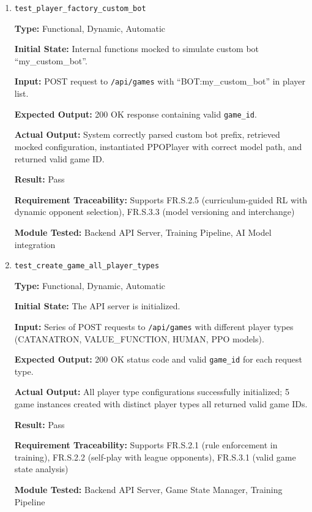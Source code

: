 \documentclass[12pt, titlepage]{article}
\begin{document}
\begin{enumerate}
\textbf{Module Tested:} Backend API Server, Game State Manager


\item \texttt{test\_player\_factory\_custom\_bot}

\textbf{Type:} Functional, Dynamic, Automatic

\textbf{Initial State:} Internal functions mocked to simulate custom bot ``my\_custom\_bot''.

\textbf{Input:} POST request to \texttt{/api/games} with ``BOT:my\_custom\_bot'' in player list.

\textbf{Expected Output:} 200 OK response containing valid \texttt{game\_id}.

\textbf{Actual Output:} System correctly parsed custom bot prefix, retrieved mocked configuration, instantiated PPOPlayer with correct model path, and returned valid game ID.

\textbf{Result:} Pass

\textbf{Requirement Traceability:} Supports FR.S.2.5 (curriculum-guided RL with dynamic opponent selection), FR.S.3.3 (model versioning and interchange)

\textbf{Module Tested:} Backend API Server, Training Pipeline, AI Model integration


\item \texttt{test\_create\_game\_all\_player\_types}

\textbf{Type:} Functional, Dynamic, Automatic

\textbf{Initial State:} The API server is initialized.

\textbf{Input:} Series of POST requests to \texttt{/api/games} with different player types (CATANATRON, VALUE\_FUNCTION, HUMAN, PPO models).

\textbf{Expected Output:} 200 OK status code and valid \texttt{game\_id} for each request type.

\textbf{Actual Output:} All player type configurations successfully initialized; 5 game instances created with distinct player types all returned valid game IDs.

\textbf{Result:} Pass

\textbf{Requirement Traceability:} Supports FR.S.2.1 (rule enforcement in training), FR.S.2.2 (self-play with league opponents), FR.S.3.1 (valid game state analysis)

\textbf{Module Tested:} Backend API Server, Game State Manager, Training Pipeline

\end{enumerate}
\end{document}
